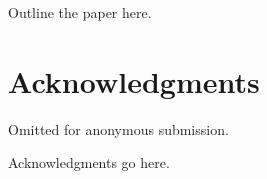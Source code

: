 Outline the paper here.

\cite{dummy}

\section*{Acknowledgments}
\ifanonymized

Omitted for anonymous submission.

\else

Acknowledgments go here.

\fi

\ifroughdraft\clearpage\fi






